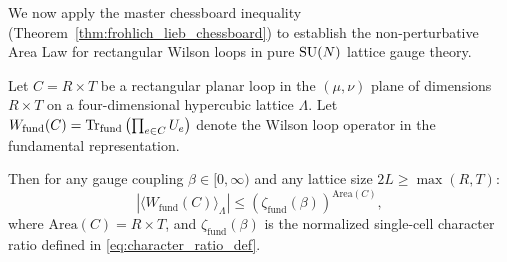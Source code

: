 We now apply the master chessboard inequality (Theorem~\ref{thm:frohlich_lieb_chessboard}) to establish the non-perturbative Area Law for rectangular Wilson loops in pure $\mathrm{SU}(N)$ lattice gauge theory.

\begin{theorem}
\label{thm:wilson_chessboard_bound}
Let $C = R \times T$ be a rectangular planar loop in the $(\mu, \nu)$ plane of dimensions $R \times T$ on a four-dimensional hypercubic lattice $\Lambda$.
Let $W_{\mathrm{fund}}(C) = \mathrm{Tr}_{\mathrm{fund}}\left( \prod_{e \in C} U_e \right)$ denote the Wilson loop operator in the fundamental representation.

Then for any gauge coupling $\beta \in [0, \infty)$ and any lattice size $2L \ge \max(R, T)$:
\begin{equation}
\label{eq:wilson_area_law_chessboard}
\left| \langle W_{\mathrm{fund}}(C) \rangle_\Lambda \right| \le \left( \zeta_{\mathrm{fund}}(\beta) \right)^{\mathrm{Area}(C)},
\end{equation}
where $\mathrm{Area}(C) = R \times T$, and $\zeta_{\mathrm{fund}}(\beta)$ is the normalized single-cell character ratio defined in \eqref{eq:character_ratio_def}.
\end{theorem}

